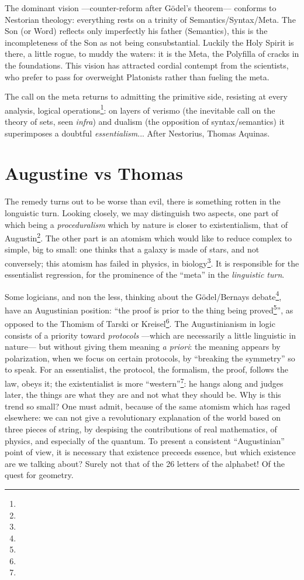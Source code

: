 \documentclass{article}
\begin{document}
The dominant vision ---counter-reform after Gödel's theorem--- conforms to Nestorian theology: everything rests on a trinity of Semantics/Syntax/Meta. The Son (or Word) reflects only imperfectly his father (Semantics), this is the incompleteness of the Son as not being consubstantial. Luckily the Holy Spirit is there, a little rogue, to muddy the waters: it is the Meta, the Polyfilla of cracks in the foundations. This vision has attracted cordial contempt from the scientists, who prefer to pass for overweight Platonists rather than fueling the meta.

The call on the meta returns to admitting the primitive side, resisting at every analysis, logical operations\footnote{}: on layers of verismo (the inevitable call on the theory of sets, seen \emph{infra}) and dualism (the opposition of syntax/semantics) it superimposes a doubtful \emph{essentialism}... After Nestorius, Thomas Aquinas.

\section{Augustine vs Thomas}
The remedy turns out to be worse than evil, there is something rotten in the longuistic turn. Looking closely, we may distinguish two aspects, one part of which being a \emph{proceduralism} which by nature is closer to existentialism, that of Augustin\footnote{}. The other part is an atomism which would like to reduce complex to simple, big to small: one thinks that a galaxy is made of stars, and not conversely; this atomism has failed in physics, in biology\footnote{}. It is responsible for the essentialist regression, for the prominence of the \enquote{meta} in the \emph{linguistic turn}.

Some logicians, and non the less, thinking about the Gödel/Bernays debate\footnote{}, have an Augustinian position: \enquote{the proof is prior to the thing being proved\footnote{}}, as opposed to the Thomism of Tarski or Kreisel\footnote{}. The Augustinianism in logic consists of a priority toward \emph{protocols} ---which are necessarily a little linguistic in nature--- but without giving them meaning \emph{a priori}: the meaning appears by polarization, when we focus on certain protocols, by \enquote{breaking the symmetry} so to speak. For an essentialist, the protocol, the formalism, the proof, follows the law, obeys it; the existentialist is more \enquote{western}\footnote{}: he hangs along and judges later, the things are what they are and not what they should be. Why is this trend so small? One must admit, because of the same atomism which has raged elsewhere: we can not give a revolutionary explanation of the world based on three pieces of string, by despising the contributions of real mathematics, of physics, and especially of the quantum. To present a consistent \enquote{Augustinian} point of view, it is necessary that existence preceeds essence, but which existence are we talking about? Surely not that of the 26 letters of the alphabet! Of the quest for geometry.
\end{document}
